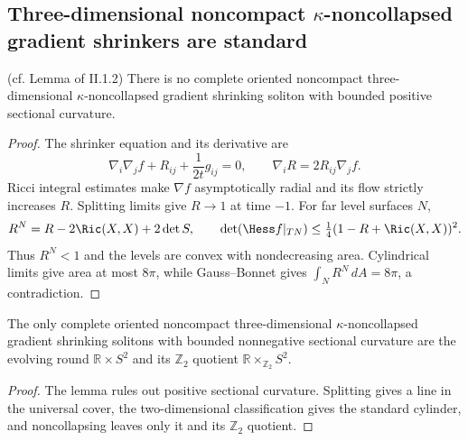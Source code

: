 \subsection{Three-dimensional noncompact $\kappa$-noncollapsed gradient shrinkers are standard}
\label{II.1.2}
\begin{lemma}
\label{lem:kl-three-dimensional-noncompact-noncollapsed-gradient-shrinkers-standard-existence-kappa-solutions}

\label{nosoliton} (cf. Lemma of II.1.2)
There is no complete oriented noncompact three-dimensional
$\kappa$-noncollapsed gradient shrinking soliton with bounded positive
sectional curvature.
\end{lemma}
\begin{proof}
\sketch The shrinker equation and its derivative are
\begin{equation}\label{IIeqn}
\nabla_i\nabla_jf+R_{ij}+\frac1{2t}g_{ij}=0,\qquad
\nabla_iR=2R_{ij}\nabla_jf.\label{gradR}
\end{equation}
Ricci integral estimates make $\nabla f$ asymptotically radial and its flow
strictly increases $R$.  Splitting limits give $R\to1$ at time $-1$.
For far level surfaces $N$,
\[
R^N=R-2\Ric(X,X)+2\det S,\qquad
\det(\Hess f|_{TN})\leq\tfrac14(1-R+\Ric(X,X))^2.
\]
Thus $R^N<1$ and the levels are convex with nondecreasing area.  Cylindrical
limits give area at most $8\pi$, while Gauss--Bonnet gives
$\int_NR^N\,dA=8\pi$, a contradiction.
\end{proof}
\begin{corollary}
\label{cor:kl-three-dimensional-noncompact-noncollapsed-gradient-shrinkers-standard-compactness-kappa-solutions}

\label{cornosoliton}
The only complete oriented noncompact three-dimensional $\kappa$-noncollapsed
gradient shrinking solitons with bounded nonnegative sectional curvature are
the evolving round $\mathbb R\times S^2$ and its
$\mathbb Z_2$ quotient $\mathbb R\times_{\mathbb Z_2}S^2$.
\end{corollary}
\begin{proof}
\sketch The lemma rules out positive sectional curvature.  Splitting gives a
line in the universal cover, the two-dimensional classification gives the
standard cylinder, and noncollapsing leaves only it and its $\mathbb Z_2$
quotient.
\end{proof}
